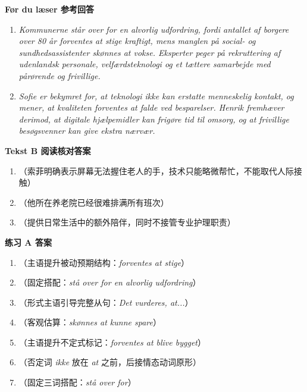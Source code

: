 \begin{answerbox}
\textbf{Før du læser 参考回答}
\begin{enumerate}
  \item \textit{Kommunerne står over for en alvorlig udfordring, fordi antallet af borgere over 80 år forventes at stige kraftigt, mens manglen på social- og sundhedsassistenter skønnes at vokse. Eksperter peger på rekruttering af udenlandsk personale, velfærdsteknologi og et tættere samarbejde med pårørende og frivillige.}
  \item \textit{Sofie er bekymret for, at teknologi ikke kan erstatte menneskelig kontakt, og mener, at kvaliteten forventes at falde ved besparelser. Henrik fremhæver derimod, at digitale hjælpemidler kan frigøre tid til omsorg, og at frivillige besøgsvenner kan give ekstra nærvær.}
\end{enumerate}

\textbf{Tekst B 阅读核对答案}
\begin{enumerate}
  \item {}（索菲明确表示屏幕无法握住老人的手，技术只能略微帮忙，不能取代人际接触）
  \item {}（他所在养老院已经很难排满所有班次）
  \item {}（提供日常生活中的额外陪伴，同时不接管专业护理职责）
\end{enumerate}

\textbf{练习 A 答案}
\begin{enumerate}
  \item {}（主语提升被动预期结构：\textit{forventes at stige}）
  \item {}（固定搭配：\textit{stå over for en alvorlig udfordring}）
  \item {}（形式主语引导完整从句：\textit{Det vurderes, at...}）
  \item {}（客观估算：\textit{skønnes at kunne spare}）
  \item {}（主语提升不定式标记：\textit{forventes at blive bygget}）
  \item {}（否定词 \textit{ikke} 放在 \textit{at} 之前，后接情态动词原形）
  \item {}（固定三词搭配：\textit{stå over for}）
\end{enumerate}


\end{answerbox}
